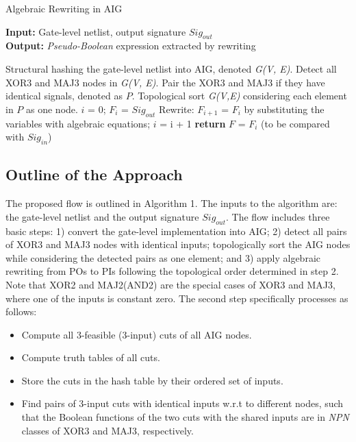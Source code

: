 \begin{algorithm}
\scriptsize
\caption{Algebraic Rewriting in AIG}\label{alg:algorithm}
\textbf{Input:} Gate-level netlist, output signature $Sig_{out}$  \\
\textbf{Output:} \textit{Pseudo-Boolean} expression extracted by rewriting 
\begin{algorithmic}[1]
\State Structural hashing the gate-level netlist into AIG, denoted \textit{G(V, E)}.
\State Detect all XOR3 and MAJ3 nodes in \textit{G(V, E)}.
\State Pair the XOR3 and MAJ3 if they have identical signals, denoted as $P$.
\State Topological sort \textit{G(V,E)} considering each element in $P$ as one node.
\State $i$ = 0; $F_{i}$ = $Sig_{out}$
\State Rewrite: $F_{i+1}$ = $F_{i}$ by substituting the variables with algebraic equations;
\State $i$ = i + 1
\EndWhile
\State \textbf{return} $F$ = $F_{i}$ (to be compared with $Sig_{in}$)
\end{algorithmic}
\end{algorithm}


\subsection{Outline of the Approach}

The proposed flow is outlined in Algorithm 1. The inputs to the algorithm are: the gate-level netlist and the output signature $Sig_{out}$. The flow includes three basic steps: 1) convert the gate-level implementation into AIG; 2) detect all pairs of XOR3 and MAJ3 nodes with identical inputs; topologically sort the AIG nodes while considering the detected pairs as one element; and 3) apply algebraic rewriting from POs to PIs following the topological order determined in step 2. Note that XOR2 and MAJ2(AND2) are the special cases of XOR3 and MAJ3, where one of the inputs is constant zero. The second step specifically processes as follows: 

\begin{itemize}

\item Compute all 3-feasible (3-input) cuts of all AIG nodes.

\item Compute truth tables of all cuts.

\item Store the cuts in the hash table by their ordered set of inputs.

\item Find pairs of 3-input cuts with identical inputs w.r.t to different nodes, such that the Boolean functions of the two cuts with the shared inputs are in \textit{NPN} classes of XOR3 and MAJ3, respectively.

\end{itemize}

